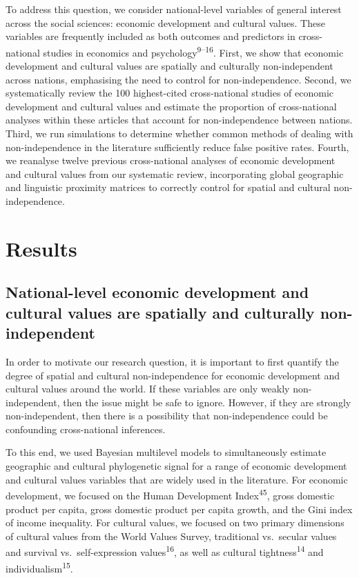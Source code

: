 \documentclass[
  man,floatsintext]{apa6}
\begin{document}
To address this question, we consider national-level variables of general interest across the social sciences: economic development and cultural values. These variables are frequently included as both outcomes and predictors in cross-national studies in economics and psychology\textsuperscript{9--16}. First, we show that economic development and cultural values are spatially and culturally non-independent across nations, emphasising the need to control for non-independence. Second, we systematically review the 100 highest-cited cross-national studies of economic development and cultural values and estimate the proportion of cross-national analyses within these articles that account for non-independence between nations. Third, we run simulations to determine whether common methods of dealing with non-independence in the literature sufficiently reduce false positive rates. Fourth, we reanalyse twelve previous cross-national analyses of economic development and cultural values from our systematic review, incorporating global geographic and linguistic proximity matrices to correctly control for spatial and cultural non-independence.

\hypertarget{results}{%
\section{Results}\label{results}}

\hypertarget{national-level-economic-development-and-cultural-values-are-spatially-and-culturally-non-independent}{%
\subsection{National-level economic development and cultural values are spatially and culturally non-independent}\label{national-level-economic-development-and-cultural-values-are-spatially-and-culturally-non-independent}}

In order to motivate our research question, it is important to first quantify the degree of spatial and cultural non-independence for economic development and cultural values around the world. If these variables are only weakly non-independent, then the issue might be safe to ignore. However, if they are strongly non-independent, then there is a possibility that non-independence could be confounding cross-national inferences.

To this end, we used Bayesian multilevel models to simultaneously estimate geographic and cultural phylogenetic signal for a range of economic development and cultural values variables that are widely used in the literature. For economic development, we focused on the Human Development Index\textsuperscript{45}, gross domestic product per capita, gross domestic product per capita growth, and the Gini index of income inequality. For cultural values, we focused on two primary dimensions of cultural values from the World Values Survey, traditional vs.~secular values and survival vs.~self-expression values\textsuperscript{16}, as well as cultural tightness\textsuperscript{14} and individualism\textsuperscript{15}.
\end{document}
